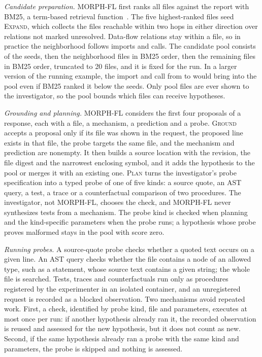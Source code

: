 \documentclass[a4paper,fleqn]{cas-sc}
\newcommand{\tool}{MORPH-FL}
\newcommand{\code}[1]{\texttt{\detokenize{#1}}}
\begin{document}
\emph{Candidate preparation.} \tool{} first ranks all files against the report with BM25, a term-based retrieval function~\citep{bm25_2009}. The five highest-ranked files seed \textsc{Expand}, which collects the files reachable within two hops in either direction over relations not marked unresolved. Data-flow relations stay within a file, so in practice the neighborhood follows imports and calls. The candidate pool consists of the seeds, then the neighborhood files in BM25 order, then the remaining files in BM25 order, truncated to 20 files, and it is fixed for the run. In a larger version of the running example, the import and call from \code{handle} to \code{normalize} would bring \code{config.py} into the pool even if BM25 ranked it below the seeds. Only pool files are ever shown to the investigator, so the pool bounds which files can receive hypotheses.

\emph{Grounding and planning.} \tool{} considers the first four proposals of a response, each with a file, a mechanism, a prediction and a probe. \textsc{Ground} accepts a proposal only if its file was shown in the request, the proposed line exists in that file, the probe targets the same file, and the mechanism and prediction are nonempty. It then builds a source location with the revision, the file digest and the narrowest enclosing symbol, and it adds the hypothesis to the pool or merges it with an existing one. \textsc{Plan} turns the investigator's probe specification into a typed probe of one of five kinds: a source quote, an AST query, a test, a trace or a counterfactual comparison of two procedures. The investigator, not \tool{}, chooses the check, and \tool{} never synthesizes tests from a mechanism. The probe kind is checked when planning and the kind-specific parameters when the probe runs; a hypothesis whose probe proves malformed stays in the pool with score zero.

\emph{Running probes.} A source-quote probe checks whether a quoted text occurs on a given line. An AST query checks whether the file contains a node of an allowed type, such as a \code{return} statement, whose source text contains a given string; the whole file is searched. Tests, traces and counterfactuals run only as procedures registered by the experimenter in an isolated container, and an unregistered request is recorded as a blocked observation. Two mechanisms avoid repeated work. First, a check, identified by probe kind, file and parameters, executes at most once per run: if another hypothesis already ran it, the recorded observation is reused and assessed for the new hypothesis, but it does not count as new. Second, if the same hypothesis already ran a probe with the same kind and parameters, the probe is skipped and nothing is assessed.
\end{document}
